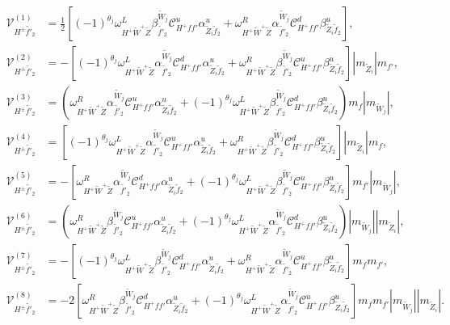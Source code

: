 \documentclass[final,3p,times,pdflatex]{elsarticle}
\begin{document}
\begin{align}
\mathcal{V}_{H^{\pm} \tilde{f'}_2}^{(1)} &	= \frac{1}{2}[(-1)^{\theta_j}\omega_{H^+ \tilde{W}^+ \tilde{Z}}^L \beta_{\tilde{f'}_2}^{\tilde{W}_j} \mathcal{C}_{H^+ f f'}^u \alpha_{\tilde{Z}_i \tilde{f}_2}^{u} + \omega_{H^+ \tilde{W}^+ \tilde{Z}}^R \alpha_{\tilde{f'}_2}^{\tilde{W}_j} \mathcal{C}_{H^+ f f'}^d \beta_{\tilde{Z}_i \tilde{f}_2}^{u}], \\
\mathcal{V}_{H^{\pm} \tilde{f'}_2}^{(2)} &= -[(-1)^{\theta_j}\omega_{H^+ \tilde{W}^+ \tilde{Z}}^L \alpha_{\tilde{f'}_2}^{\tilde{W}_j} \mathcal{C}_{H^+ f f'}^d \alpha_{\tilde{Z}_i \tilde{f}_2}^{u} + \omega_{H^+ \tilde{W}^+ \tilde{Z}}^R \beta_{\tilde{f'}_2}^{\tilde{W}_j} \mathcal{C}_{H^+ f f'}^u \beta_{\tilde{Z}_i \tilde{f}_2}^{u}]|m_{\tilde{Z}_i}|m_{f'}, \\
\mathcal{V}_{H^{\pm} \tilde{f'}_2}^{(3)} &= (\omega_{H^+ \tilde{W}^+ \tilde{Z}}^R \alpha_{\tilde{f'}_2}^{\tilde{W}_j} \mathcal{C}_{H^+ f f'}^u \alpha_{\tilde{Z}_i \tilde{f}_2}^{u} +  (-1)^{\theta_j} \omega_{H^+ \tilde{W}^+ \tilde{Z}}^L \beta_{\tilde{f'}_2}^{\tilde{W}_j} \mathcal{C}_{H^+ f f'}^d \beta_{\tilde{Z}_i \tilde{f}_2}^{u})m_{f}|m_{\tilde{W}_j}|, \\
\mathcal{V}_{H^{\pm} \tilde{f'}_2}^{(4)} &= [(-1)^{\theta_j}\omega_{H^+ \tilde{W}^+ \tilde{Z}}^L \alpha_{\tilde{f'}_2}^{\tilde{W}_j} \mathcal{C}_{H^+ f f'}^u \alpha_{\tilde{Z}_i \tilde{f}_2}^{u} + \omega_{H^+ \tilde{W}^+ \tilde{Z}}^R \beta_{\tilde{f'}_2}^{\tilde{W}_j} \mathcal{C}_{H^+ f f'}^d \beta_{\tilde{Z}_i \tilde{f}_2}^{u}]|m_{\tilde{Z}_i}|m_{f}, \\
\mathcal{V}_{H^{\pm} \tilde{f'}_2}^{(5)} &= -[\omega_{H^+ \tilde{W}^+ \tilde{Z}}^R \alpha_{\tilde{f'}_2}^{\tilde{W}_j} \mathcal{C}_{H^+ f f'}^d \alpha_{\tilde{Z}_i \tilde{f}_2}^{u} + (-1)^{\theta_j} \omega_{H^+ \tilde{W}^+ \tilde{Z}}^L \beta_{\tilde{f'}_2}^{\tilde{W}_j} \mathcal{C}_{H^+ f f'}^u \beta_{\tilde{Z}_i \tilde{f}_2}^{u}]m_{f'}|m_{\tilde{W}_j}|, \\
\mathcal{V}_{H^{\pm} \tilde{f'}_2}^{(6)} &= (\omega_{H^+ \tilde{W}^+ \tilde{Z}}^R \beta_{\tilde{f'}_2}^{\tilde{W}_j} \mathcal{C}_{H^+ f f'}^u \alpha_{\tilde{Z}_i \tilde{f}_2}^{u} + (-1)^{\theta_j} \omega_{H^+ \tilde{W}^+ \tilde{Z}}^L \alpha_{\tilde{f'}_2}^{\tilde{W}_j} \mathcal{C}_{H^+ f f'}^d \beta_{\tilde{Z}_i \tilde{f}_2}^{u})|m_{\tilde{W}_j}||m_{\tilde{Z}_i}|, \\
\mathcal{V}_{H^{\pm} \tilde{f'}_2}^{(7)} &= -[(-1)^{\theta_j}\omega_{H^+ \tilde{W}^+ \tilde{Z}}^L \beta_{\tilde{f'}_2}^{\tilde{W}_j} \mathcal{C}_{H^+ f f'}^d \alpha_{\tilde{Z}_i \tilde{f}_2}^{u} + \omega_{H^+ \tilde{W}^+ \tilde{Z}}^R \alpha_{\tilde{f'}_2}^{\tilde{W}_j} \mathcal{C}_{H^+ f f'}^u \beta_{\tilde{Z}_i \tilde{f}_2}^{u}]m_{f}m_{f'}, \\
\mathcal{V}_{H^{\pm} \tilde{f'}_2}^{(8)} &= -2[\omega_{H^+ \tilde{W}^+ \tilde{Z}}^R \beta_{\tilde{f'}_2}^{\tilde{W}_j}  \mathcal{C}_{H^+ f f'}^d \alpha_{\tilde{Z}_i \tilde{f}_2}^{u} + (-1)^{\theta_j}\omega_{H^+ \tilde{W}^+ \tilde{Z}}^L \alpha_{\tilde{f'}_2}^{\tilde{W}_j} \mathcal{C}_{H^+ f f'}^u \beta_{\tilde{Z}_i \tilde{f}_2}^{u}]m_{f}m_{f'}|m_{\tilde{W}_j}||m_{\tilde{Z}_i}|.
\end{align}
\end{document}
